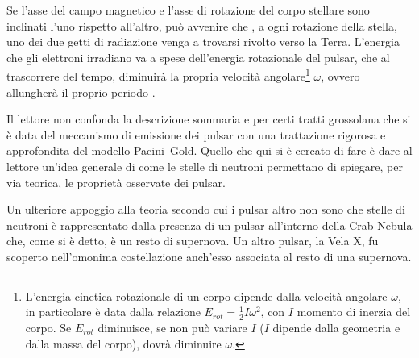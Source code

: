 \par
Se l'asse del campo magnetico e l'asse di rotazione del corpo stellare sono inclinati l'uno rispetto all'altro, può avvenire che , a ogni rotazione della stella, uno dei due getti di radiazione venga a trovarsi rivolto verso la Terra.
L'energia che gli elettroni irradiano va a spese dell'energia rotazionale del pulsar, che al trascorrere del tempo, diminuir\`{a} la propria velocit\`{a} angolare\footnote{L'energia cinetica rotazionale di un corpo dipende dalla velocit\`{a} angolare $\omega$, in particolare è data dalla relazione $E_{rot}=\frac{1}{2}I\omega^{2}$, con $I$ momento di inerzia del corpo.
Se $E_{rot}$ diminuisce, se non può variare $I$ ($I$ dipende dalla geometria e dalla massa del corpo), dovr\`{a} diminuire $\omega$.} $\omega$, ovvero allungher\`{a} il proprio periodo \Cite{rosino}.
\par
Il lettore non confonda la descrizione sommaria e per certi tratti grossolana che si è data del meccanismo di emissione dei pulsar con una trattazione rigorosa e approfondita del modello Pacini--Gold. Quello che qui si è cercato di fare è dare al lettore un'idea generale di come le stelle di neutroni permettano di spiegare, per via teorica, le propriet\`{a} osservate dei pulsar.
\par
Un ulteriore appoggio alla teoria secondo cui i pulsar altro non sono che stelle di neutroni è rappresentato dalla presenza di un pulsar all'interno della Crab Nebula che, come si è detto, è un resto di supernova. Un altro pulsar, la Vela X, fu scoperto nell'omonima costellazione anch'esso associata al resto di una supernova.



